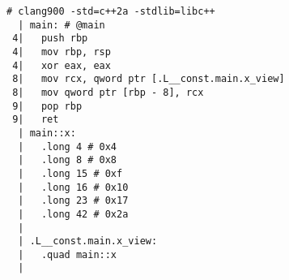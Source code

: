 \begin{lstlisting}[language={},numbers=none,title=\href{https://godbolt.org/z/MXgBx4}{\texttt{godbolt.org/z/MXgBx4}}]
# clang900 -std=c++2a -stdlib=libc++
  | main: # @main
 4|   push rbp
 4|   mov rbp, rsp
 4|   xor eax, eax
 8|   mov rcx, qword ptr [.L__const.main.x_view]
 8|   mov qword ptr [rbp - 8], rcx
 9|   pop rbp
 9|   ret
  | main::x:
  |   .long 4 # 0x4
  |   .long 8 # 0x8
  |   .long 15 # 0xf
  |   .long 16 # 0x10
  |   .long 23 # 0x17
  |   .long 42 # 0x2a
  | 
  | .L__const.main.x_view:
  |   .quad main::x
  |
\end{lstlisting}
